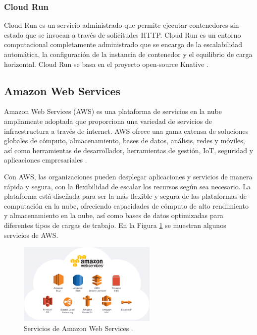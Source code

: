 \subsubsection{Cloud Run}
Cloud Run es un servicio administrado que permite ejecutar contenedores sin
estado que se invocan a través de solicitudes HTTP. Cloud Run es un entorno
computacional completamente administrado que se encarga de la escalabilidad
automática, la configuración de la instancia de contenedor y el equilibrio de
carga horizontal. Cloud Run se basa en el proyecto open-source Knative \cite{geewax2018google}.

\subsection{Amazon Web Services}

Amazon Web Services (AWS) es una plataforma de servicios en la nube ampliamente
adoptada que proporciona una variedad de servicios de infraestructura a través de
internet. AWS ofrece una gama extensa de soluciones globales de cómputo,
almacenamiento, bases de datos, análisis, redes y móviles, así como herramientas
de desarrollador, herramientas de gestión, IoT, seguridad y aplicaciones
empresariales \cite{wittig2023amazon}.

Con AWS, las organizaciones pueden desplegar aplicaciones y servicios de manera
rápida y segura, con la flexibilidad de escalar los recursos según sea necesario.
La plataforma está diseñada para ser la más flexible y segura de las plataformas
de computación en la nube, ofreciendo capacidades de cómputo de alto rendimiento
y almacenamiento en la nube, así como bases de datos optimizadas para diferentes
tipos de cargas de trabajo. En la Figura \ref{fig:aws-services} se muestran
algunos servicios de AWS.

\begin{figure}[!htbp]
  \centering
  \includegraphics[width=0.6\textwidth]{imagenes/02-marco-teorico/aws-services.png}
  \caption[Servicios de Amazon Web Services]{Servicios de Amazon Web Services \cite{thinkwik_2018_aws}.}
  \label{fig:aws-services}
\end{figure}

